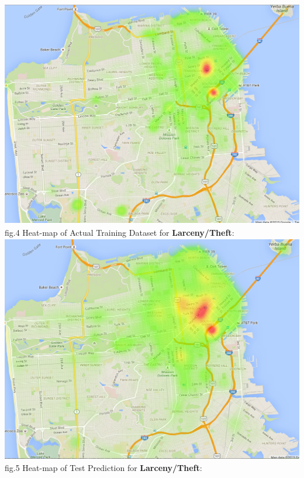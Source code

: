 \documentclass[12pt]{article}
\newenvironment{p4}[2][Part V Results and Evaluation]{\begin{trivlist}
\item[\hskip \labelsep {\bfseries #1}\hskip \labelsep {\bfseries #2}]}{\end{trivlist}}
\begin{document}
\begin{p4}{}
\\
\newpage
\begin{center}
\includegraphics[height=10cm]{LARCENY_THEFT_train.png}\\
fig.4 Heat-map of Actual Training Dataset for \textbf{Larceny/Theft}:
\\
\includegraphics[height=10cm]{LARCENY_THEFT_test.png}\\
fig.5 Heat-map of Test Prediction for \textbf{Larceny/Theft}:
\end{center}
\newpage
\begin{center}

\end{center}
\end{p4}
\end{document}
